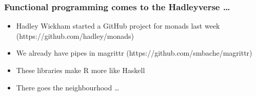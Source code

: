 \documentclass{beamer}
\begin{document}
\begin{frame}
\frametitle{Functional programming comes to the Hadleyverse \ldots}
\begin{itemize}
\item Hadley Wickham started a GitHub project for monads last week (https://github.com/hadley/monads)
\item We already have pipes in magrittr (https://github.com/smbache/magrittr)
\item These libraries make R more like Haskell
\item There goes the neighbourhood \ldots
\end{itemize}
\end{frame}
\end{document}
